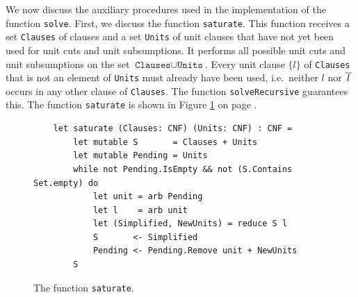 We now discuss the auxiliary procedures used in the implementation of the function
\texttt{solve}.
First, we discuss the function \texttt{saturate}. This function receives a
set \texttt{Clauses} of clauses and a set \texttt{Units} of unit clauses that have not yet been used for unit
cuts and unit subsumptions.  It performs all possible unit cuts and unit subsumptions on the set
$\texttt{Clauses} \cup \texttt{Units}$.  Every unit clause $\{l\}$ of \texttt{Clauses} that is not an element of
\texttt{Units} must already have been used, i.e.~neither $l$ nor $\overline{\,l\,}$ occurs in any other clause of
\texttt{Clauses}.  The function \texttt{solveRecursive} guarantees this.
The function \texttt{saturate} is shown in Figure \ref{fig:saturate} on page \pageref{fig:saturate}.

\begin{figure}[!ht]
  \centering
\begin{verbatim}
    let saturate (Clauses: CNF) (Units: CNF) : CNF =
        let mutable S       = Clauses + Units
        let mutable Pending = Units
        while not Pending.IsEmpty && not (S.Contains Set.empty) do
            let unit = arb Pending
            let l    = arb unit
            let (Simplified, NewUnits) = reduce S l
            S       <- Simplified
            Pending <- Pending.Remove unit + NewUnits
        S
\end{verbatim}
\vspace*{-0.3cm}
  \caption{The function \texttt{saturate}. }
  \label{fig:saturate}
\end{figure} 
